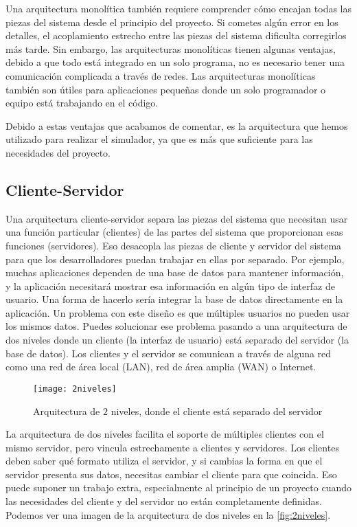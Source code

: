 Una arquitectura monolítica también requiere comprender cómo encajan todas las piezas del sistema desde el principio del proyecto. Si cometes algún error en los detalles, el acoplamiento estrecho entre las piezas del sistema dificulta corregirlos más tarde.
Sin embargo, las arquitecturas monolíticas tienen algunas ventajas, debido a que todo está integrado en un solo programa, no es necesario tener una comunicación complicada a través de redes.
Las arquitecturas monolíticas también son útiles para aplicaciones pequeñas donde un solo programador o equipo está trabajando en el código.

Debido a estas ventajas que acabamos de comentar, es la arquitectura que hemos utilizado para realizar el simulador, ya que es más que suficiente para las necesidades del proyecto.
\subsection{Cliente-Servidor}
Una arquitectura cliente-servidor separa las piezas del sistema que necesitan usar una función particular (clientes) de las partes del sistema que proporcionan esas funciones (servidores). Eso desacopla las piezas de cliente y servidor del sistema para que los desarrolladores puedan trabajar en ellas por separado.
Por ejemplo, muchas aplicaciones dependen de una base de datos para mantener información, y la aplicación necesitará mostrar esa información en algún tipo de interfaz de usuario. Una forma de hacerlo sería integrar la base de datos directamente en la aplicación.
Un problema con este diseño es que múltiples usuarios no pueden usar los mismos datos. Puedes solucionar ese problema pasando a una arquitectura de dos niveles donde un cliente (la interfaz de usuario) está separado del servidor (la base de datos). Los clientes y el servidor se comunican a través de alguna red como una red de área local (LAN), red de área amplia (WAN) o Internet.
\begin{figure}[h!]
	\centering
	\texttt{[image: 2niveles]}
	\caption{Arquitectura de $2$ niveles, donde el cliente está separado del servidor}
	\label{fig:2niveles}
\end{figure}
La arquitectura de dos niveles facilita el soporte de múltiples clientes con el mismo servidor, pero vincula estrechamente a clientes y servidores. Los clientes deben saber qué formato utiliza el servidor, y si cambias la forma en que el servidor presenta sus datos, necesitas cambiar el cliente para que coincida. Eso puede suponer un trabajo extra, especialmente al principio de un proyecto cuando las necesidades del cliente y del servidor no están completamente definidas. Podemos ver una imagen de la arquitectura de dos niveles en la \autoref{fig:2niveles}.

